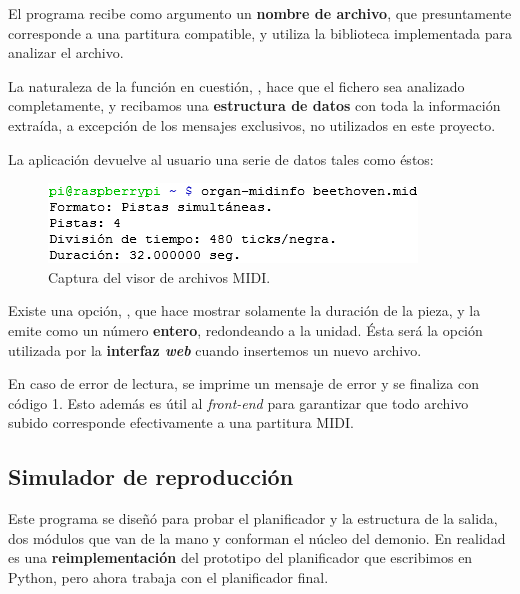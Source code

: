 El programa recibe como argumento un \textbf{nombre de archivo}, que presuntamente corresponde a una partitura compatible, y utiliza la biblioteca implementada para analizar el archivo.

La naturaleza de la función en cuestión, , hace que el fichero sea analizado completamente, y recibamos una \textbf{estructura de datos} con toda la información extraída, a excepción de los mensajes exclusivos, no utilizados en este proyecto.

La aplicación devuelve al usuario una serie de datos tales como éstos:

\smallskip

\begin{figure}[H]
	\noindent \begin{centering}
		\includegraphics[width=\linewidth/2]{capitulo5/cap_midinfo}
		\par\end{centering}
	\smallskip
	\caption{\label{fig:cap_midinfo} Captura del visor de archivos MIDI.}
\end{figure} 

\smallskip

Existe una opción, , que hace mostrar solamente la duración de la pieza, y la emite como un número \textbf{entero}, redondeando a la unidad. Ésta será la opción utilizada por la \textbf{interfaz \textit{web}} cuando insertemos un nuevo archivo.

En caso de error de lectura, se imprime un mensaje de error y se finaliza con código 1. Esto además es útil al \textit{front-end} para garantizar que todo archivo subido corresponde efectivamente a una partitura \acrshort{MIDI}.

\subsection{Simulador de reproducción}
\label{subsec:simulador_reproduccion}

Este programa se diseñó para probar el planificador y la estructura de la salida, dos módulos que van de la mano y conforman el núcleo del demonio. En realidad es una \textbf{reimplementación} del prototipo del planificador que escribimos en Python, pero ahora trabaja con el planificador final.

